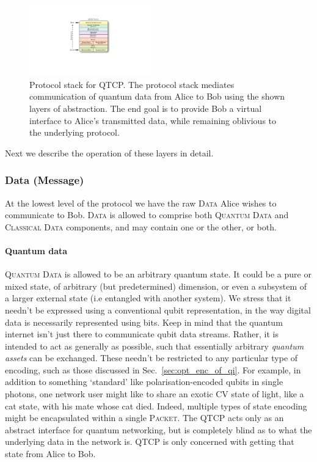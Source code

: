 \begin{figure}[!htb]
\includegraphics[width=0.47\textwidth]{stack}
\caption{Protocol stack for QTCP. The protocol stack mediates communication of quantum data from Alice to Bob using the shown layers of abstraction. The end goal is to provide Bob a virtual interface to Alice's transmitted data, while remaining oblivious to the underlying protocol.} \label{fig:stack}
\end{figure}

Next we describe the operation of these layers in detail.

%
%

\subsubsection{Data (Message)}  \label{sec:data_message_layer}

At the lowest level of the protocol we have the raw \textsc{Data} Alice wishes to communicate to Bob. \textsc{Data} is allowed to comprise both \textsc{Quantum Data} and \textsc{Classical Data} components, and may contain one or the other, or both.

%
%

\paragraph{Quantum data} 

\textsc{Quantum Data} is allowed to be an arbitrary quantum state. It could be a pure or mixed state, of arbitrary (but predetermined) dimension, or even a subsystem of a larger external state (i.e entangled with another system). We stress that it needn't be expressed using a conventional qubit representation, in the way digital data is necessarily represented using bits. Keep in mind that the quantum internet isn't just there to communicate qubit data streams. Rather, it is intended to act as generally as possible, such that essentially arbitrary \textit{quantum assets} can be exchanged. These needn't be restricted to any particular type of encoding, such as those discussed in Sec.~\ref{sec:opt_enc_of_qi}. For example, in addition to something `standard' like polarisation-encoded qubits in single photons, one network user might like to share an exotic CV state of light, like a cat state, with his mate whose cat died. Indeed, multiple types of state encoding might be encapsulated within a single \textsc{Packet}. The QTCP acts only as an abstract interface for quantum networking, but is completely blind as to what the underlying data in the network is. QTCP is only concerned with getting that state from Alice to Bob.

